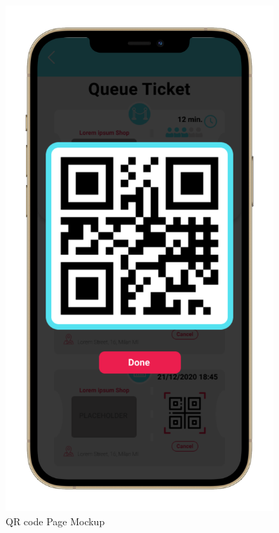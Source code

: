 \begin{figure}
\begin{minipage}{.45\linewidth}
    \includegraphics[width=0.9\textwidth]{Images/UserInterfaces/withiphonephrames/QRcodePage_iphone12promaxgold_portrait.png}
    \caption{\label{fig:InterfacesDiagram}{QR code Page Mockup}}
\end{minipage}
\end{figure}

